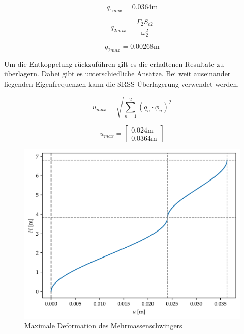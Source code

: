 \documentclass[
  letterpaper,
  DIV=11]{scrreprt}
\begin{document}
\begin{equation}q_{1 max} = 0.0364 \text{m}\end{equation}

\begin{equation}q_{2 max} = \frac{\Gamma_{2} S_{e 2}}{\omega_{2}^{2}}\end{equation}

\begin{equation}q_{2 max} = 0.00268 \text{m}\end{equation}

Um die Entkoppelung rückzuführen gilt es die erhaltenen Resultate zu
überlagern. Dabei gibt es unterschiedliche Ansätze. Bei weit auseinander
liegenden Eigenfrequenzen kann die SRSS-Überlagerung verwendet werden.

\[u_{max} = \sqrt{\sum_{n=1}^2 (q_{n} \cdot \phi_n)^2}\]

\begin{equation}u_{max} = \left[\begin{matrix}0.024 \text{m}\\0.0364 \text{m}\end{matrix}\right]\end{equation}

\begin{figure}[H]

{\centering \includegraphics{index_files/mediabag/mms_06_files/figure-pdf/fig-deformation-output-1.pdf}

}

\caption{\label{fig-deformation}Maximale Deformation des
Mehrmassenschwingers}

\end{figure}
\end{document}
